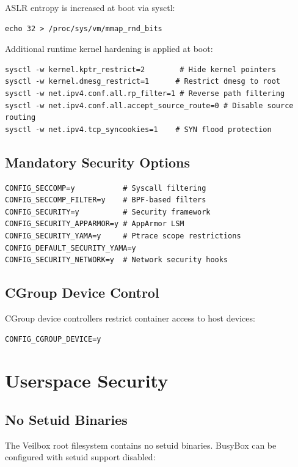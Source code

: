 ASLR entropy is increased at boot via sysctl:
\begin{lstlisting}
echo 32 > /proc/sys/vm/mmap_rnd_bits
\end{lstlisting}

Additional runtime kernel hardening is applied at boot:
\begin{lstlisting}
sysctl -w kernel.kptr_restrict=2        # Hide kernel pointers
sysctl -w kernel.dmesg_restrict=1      # Restrict dmesg to root
sysctl -w net.ipv4.conf.all.rp_filter=1 # Reverse path filtering
sysctl -w net.ipv4.conf.all.accept_source_route=0 # Disable source routing
sysctl -w net.ipv4.tcp_syncookies=1    # SYN flood protection
\end{lstlisting}

\subsection{Mandatory Security Options}

\begin{lstlisting}
CONFIG_SECCOMP=y           # Syscall filtering
CONFIG_SECCOMP_FILTER=y    # BPF-based filters
CONFIG_SECURITY=y          # Security framework
CONFIG_SECURITY_APPARMOR=y # AppArmor LSM
CONFIG_SECURITY_YAMA=y     # Ptrace scope restrictions
CONFIG_DEFAULT_SECURITY_YAMA=y
CONFIG_SECURITY_NETWORK=y  # Network security hooks
\end{lstlisting}

\subsection{CGroup Device Control}

CGroup device controllers restrict container access to host devices:

\begin{lstlisting}
CONFIG_CGROUP_DEVICE=y
\end{lstlisting}

\section{Userspace Security}

\subsection{No Setuid Binaries}

The Veilbox root filesystem contains no setuid binaries. BusyBox can be
configured with setuid support disabled:

